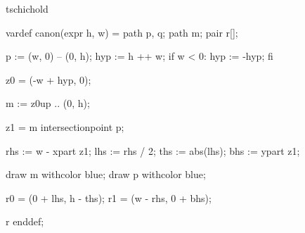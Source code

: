 


\startenvironment tschichold

	\startMPdefinitions
		vardef canon(expr h, w) =
			path p, q;
			path m;
			pair r[];

			p := (w, 0) -- (0, h); %
			hyp := h ++ w; %
			if w < 0:
				hyp := -hyp;
			fi

			z0 = (-w + hyp, 0); %

			m := z0{up} .. (0, h);

			z1 = m intersectionpoint p;

			rhs := w - xpart z1;
			lhs := rhs / 2;
			ths := abs(lhs); %
			bhs := ypart z1;

			draw m withcolor blue;
			draw p withcolor blue;

			r0 = (0 + lhs, h - ths); %
			r1 = (w - rhs, 0 + bhs); %

			r
		enddef;
	\stopMPdefinitions

\stopenvironment



